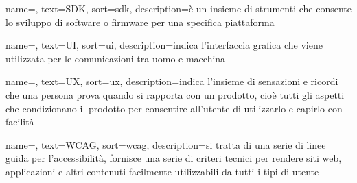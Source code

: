  {
    name=,
    text=SDK,
    sort=sdk,
    description={è un insieme di strumenti che consente lo sviluppo di software o firmware per una specifica piattaforma}
}

 {
    name=,
    text=UI,
    sort=ui,
    description={indica l'interfaccia grafica che viene utilizzata per le comunicazioni tra uomo e macchina}
}

 {
    name=,
    text=UX,
    sort=ux,
    description={indica l'insieme di sensazioni e ricordi che una persona prova quando si rapporta con un prodotto, cioè tutti gli aspetti che condizionano il prodotto per consentire all'utente di utilizzarlo e capirlo con facilità}
}

 {
    name=,
    text=WCAG,
    sort=wcag,
    description={si tratta di una serie di linee guida per l'accessibilità, fornisce una serie di criteri tecnici per rendere siti web, applicazioni e altri contenuti facilmente utilizzabili da tutti i tipi di utente}
}
